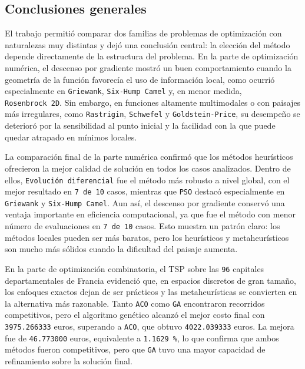 \documentclass[
  12pt,
  letterpaper,
  DIV=11,
  numbers=noendperiod]{scrartcl}
\begin{document}
\subsection{Conclusiones generales}\label{conclusiones-generales}

El trabajo permitió comparar dos familias de problemas de optimización
con naturalezas muy distintas y dejó una conclusión central: la elección
del método depende directamente de la estructura del problema. En la
parte de optimización numérica, el descenso por gradiente mostró un buen
comportamiento cuando la geometría de la función favorecía el uso de
información local, como ocurrió especialmente en \texttt{Griewank},
\texttt{Six-Hump\ Camel} y, en menor medida, \texttt{Rosenbrock\ 2D}.
Sin embargo, en funciones altamente multimodales o con paisajes más
irregulares, como \texttt{Rastrigin}, \texttt{Schwefel} y
\texttt{Goldstein-Price}, su desempeño se deterioró por la sensibilidad
al punto inicial y la facilidad con la que puede quedar atrapado en
mínimos locales.

La comparación final de la parte numérica confirmó que los métodos
heurísticos ofrecieron la mejor calidad de solución en todos los casos
analizados. Dentro de ellos, \texttt{Evolución\ diferencial} fue el
método más robusto a nivel global, con el mejor resultado en
\texttt{7\ de\ 10} casos, mientras que \texttt{PSO} destacó
especialmente en \texttt{Griewank} y \texttt{Six-Hump\ Camel}. Aun así,
el descenso por gradiente conservó una ventaja importante en eficiencia
computacional, ya que fue el método con menor número de evaluaciones en
\texttt{7\ de\ 10} casos. Esto muestra un patrón claro: los métodos
locales pueden ser más baratos, pero los heurísticos y metaheurísticos
son mucho más sólidos cuando la dificultad del paisaje aumenta.

En la parte de optimización combinatoria, el TSP sobre las \texttt{96}
capitales departamentales de Francia evidenció que, en espacios
discretos de gran tamaño, los enfoques exactos dejan de ser prácticos y
las metaheurísticas se convierten en la alternativa más razonable. Tanto
\texttt{ACO} como \texttt{GA} encontraron recorridos competitivos, pero
el algoritmo genético alcanzó el mejor costo final con
\texttt{3975.266333} euros, superando a \texttt{ACO}, que obtuvo
\texttt{4022.039333} euros. La mejora fue de \texttt{46.773000} euros,
equivalente a \texttt{1.1629\ \%}, lo que confirma que ambos métodos
fueron competitivos, pero que \texttt{GA} tuvo una mayor capacidad de
refinamiento sobre la solución final.
\end{document}
